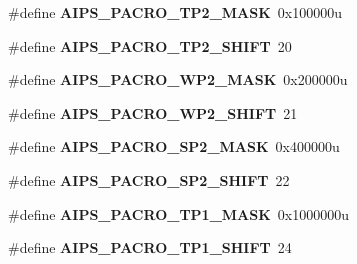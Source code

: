 \begin{DoxyCompactItemize}
\item 
\hypertarget{group___a_i_p_s___register___masks_ga2d960342689efa66853c4197932feef2}{}\#define {\bfseries A\+I\+P\+S\+\_\+\+P\+A\+C\+R\+O\+\_\+\+T\+P2\+\_\+\+M\+A\+S\+K}~0x100000u\label{group___a_i_p_s___register___masks_ga2d960342689efa66853c4197932feef2}

\item 
\hypertarget{group___a_i_p_s___register___masks_ga97553189904ef25430ecdc72a8c2f5d3}{}\#define {\bfseries A\+I\+P\+S\+\_\+\+P\+A\+C\+R\+O\+\_\+\+T\+P2\+\_\+\+S\+H\+I\+F\+T}~20\label{group___a_i_p_s___register___masks_ga97553189904ef25430ecdc72a8c2f5d3}

\item 
\hypertarget{group___a_i_p_s___register___masks_ga4dfb64bd463f84591d6040388c7caf87}{}\#define {\bfseries A\+I\+P\+S\+\_\+\+P\+A\+C\+R\+O\+\_\+\+W\+P2\+\_\+\+M\+A\+S\+K}~0x200000u\label{group___a_i_p_s___register___masks_ga4dfb64bd463f84591d6040388c7caf87}

\item 
\hypertarget{group___a_i_p_s___register___masks_ga1773aa6de3588e8e57376ab3e2d4545d}{}\#define {\bfseries A\+I\+P\+S\+\_\+\+P\+A\+C\+R\+O\+\_\+\+W\+P2\+\_\+\+S\+H\+I\+F\+T}~21\label{group___a_i_p_s___register___masks_ga1773aa6de3588e8e57376ab3e2d4545d}

\item 
\hypertarget{group___a_i_p_s___register___masks_ga808d6652239c69efc277cac5a0c8475f}{}\#define {\bfseries A\+I\+P\+S\+\_\+\+P\+A\+C\+R\+O\+\_\+\+S\+P2\+\_\+\+M\+A\+S\+K}~0x400000u\label{group___a_i_p_s___register___masks_ga808d6652239c69efc277cac5a0c8475f}

\item 
\hypertarget{group___a_i_p_s___register___masks_ga7b67fb0767452471cc1ad1afc9d5e142}{}\#define {\bfseries A\+I\+P\+S\+\_\+\+P\+A\+C\+R\+O\+\_\+\+S\+P2\+\_\+\+S\+H\+I\+F\+T}~22\label{group___a_i_p_s___register___masks_ga7b67fb0767452471cc1ad1afc9d5e142}

\item 
\hypertarget{group___a_i_p_s___register___masks_ga26b62ac3d6a4b73a5ab591d34080d80e}{}\#define {\bfseries A\+I\+P\+S\+\_\+\+P\+A\+C\+R\+O\+\_\+\+T\+P1\+\_\+\+M\+A\+S\+K}~0x1000000u\label{group___a_i_p_s___register___masks_ga26b62ac3d6a4b73a5ab591d34080d80e}

\item 
\hypertarget{group___a_i_p_s___register___masks_gafaf4aa774127fcacd3a95c5923d44742}{}\#define {\bfseries A\+I\+P\+S\+\_\+\+P\+A\+C\+R\+O\+\_\+\+T\+P1\+\_\+\+S\+H\+I\+F\+T}~24\label{group___a_i_p_s___register___masks_gafaf4aa774127fcacd3a95c5923d44742}


\end{DoxyCompactItemize}
